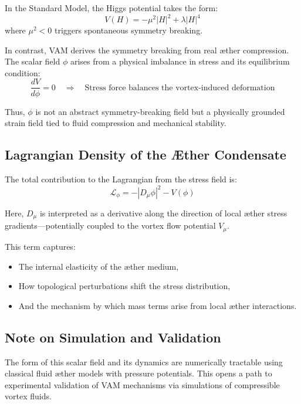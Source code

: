 In the Standard Model, the Higgs potential takes the form:
\[
    V(H) = -\mu^2 |H|^2 + \lambda |H|^4
\]
where $\mu^2 < 0$ triggers spontaneous symmetry breaking.

In contrast, VAM derives the symmetry breaking from real æther compression. The scalar field $\phi$ arises from a physical imbalance in stress and its equilibrium condition:
\[
    \frac{dV}{d\phi} = 0 \quad \Rightarrow \quad \text{Stress force balances the vortex-induced deformation}
\]

Thus, $\phi$ is not an abstract symmetry-breaking field but a physically grounded strain field tied to fluid compression and mechanical stability.

\subsection*{Lagrangian Density of the Æther Condensate}

The total contribution to the Lagrangian from the stress field is:
\[
    \mathcal{L}_\phi = -|D_\mu \phi|^2 - V(\phi)
\]

Here, $D_\mu$ is interpreted as a derivative along the direction of local æther stress gradients—potentially coupled to the vortex flow potential $V_\mu$.

This term captures:
\begin{itemize}
    \item The internal elasticity of the æther medium,
    \item How topological perturbations shift the stress distribution,
    \item And the mechanism by which mass terms arise from local æther interactions.
\end{itemize}

\subsection*{Note on Simulation and Validation}

The form of this scalar field and its dynamics are numerically tractable using classical fluid æther models with pressure potentials. This opens a path to experimental validation of VAM mechanisms via simulations of compressible vortex fluids.
